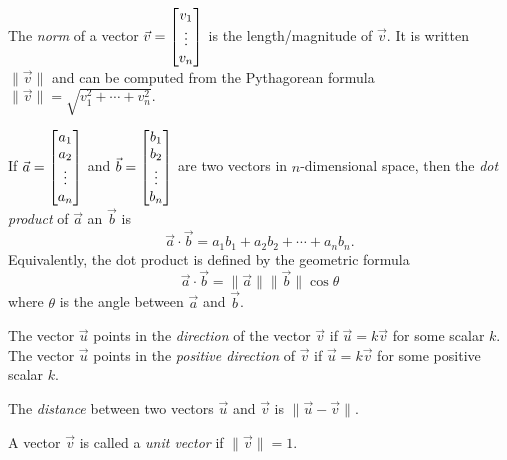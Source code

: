 \begin{SaveDefinition}[key=Norm, title={Norm}]
	The
	\emph{norm} of a vector $\vec v=\begin{bmatrix}v_1\\\vdots\\v_n\end{bmatrix}$ is the length/magnitude
	of $\vec v$. It is written $\|\vec v\|$ and can be computed from the Pythagorean
	formula
	$
		\|\vec v\|=\sqrt{v_1^2+\cdots +v_n^2}.
	$

\end{SaveDefinition}

\begin{SaveDefinition}[key=DotProduct, title={Dot Product}]
	If $\vec a=\begin{bmatrix}a_1\\a_2\\ \vdots\\a_n\end{bmatrix}$ and
	$\vec b=\begin{bmatrix}b_1\\b_2\\ \vdots\\b_n\end{bmatrix}$ are two vectors in $n$-dimensional
	space, then the
	\emph{dot product} of $\vec a$ an $\vec b$ is
	\[
		\vec a\cdot\vec b = a_{1}b_{1}+a_{2}b_{2}+\cdots+a_{n}b_{n}.
	\]
	 Equivalently, the dot product is defined by the geometric formula
	\[
		\vec a\cdot \vec b = \|\vec a\|\|\vec b\|\cos \theta
	\]
	 where $\theta$ is the angle between $\vec a$ and $\vec b$.
\end{SaveDefinition}

\begin{SaveDefinition}[key=Direction, title={Direction}]
	The vector $\vec u$ points in the \emph{direction} of
	the vector $\vec v$ if $\vec u=k\vec v$ for some scalar $k$.
	The vector $\vec u$ points in the \emph{positive direction} of
	$\vec v$ if $\vec u=k\vec v$ for some positive scalar $k$.
\end{SaveDefinition}

\begin{SaveDefinition}[key=Distance, title={Distance}]
	The
	\emph{distance} between two vectors $\vec u$ and $\vec v$ is
	$\|\vec u-\vec v\|$.
\end{SaveDefinition}

\begin{SaveDefinition}[key=UnitVector, title={Unit Vector}]
	A vector $\vec v$ is called a
	\emph{unit vector} if $\|\vec v\|=1$.
\end{SaveDefinition}

